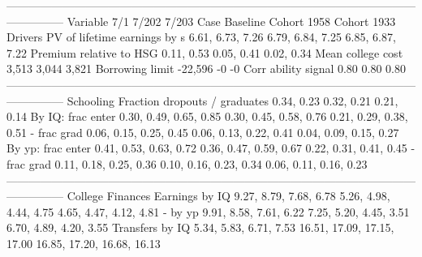 ---------------------------------------------------------------------------------------------------------------------------
                              Variable                          7/1                       7/202                       7/203
                                  Case                     Baseline                 Cohort 1958                 Cohort 1933
                               Drivers                                                                                     
          PV of lifetime earnings by s             6.61, 6.73, 7.26            6.79, 6.84, 7.25            6.85, 6.87, 7.22
               Premium relative to HSG                   0.11, 0.53                  0.05, 0.41                  0.02, 0.34
                     Mean college cost                        3,513                       3,044                       3,821
                       Borrowing limit                      -22,596                          -0                          -0
                   Corr ability signal                         0.80                        0.80                        0.80
---------------------------------------------------------------------------------------------------------------------------
                             Schooling                                                                                     
         Fraction dropouts / graduates                   0.34, 0.23                  0.32, 0.21                  0.21, 0.14
                     By IQ: frac enter       0.30, 0.49, 0.65, 0.85      0.30, 0.45, 0.58, 0.76      0.21, 0.29, 0.38, 0.51
                           - frac grad       0.06, 0.15, 0.25, 0.45      0.06, 0.13, 0.22, 0.41      0.04, 0.09, 0.15, 0.27
                     By yp: frac enter       0.41, 0.53, 0.63, 0.72      0.36, 0.47, 0.59, 0.67      0.22, 0.31, 0.41, 0.45
                           - frac grad       0.11, 0.18, 0.25, 0.36      0.10, 0.16, 0.23, 0.34      0.06, 0.11, 0.16, 0.23
---------------------------------------------------------------------------------------------------------------------------
                      College Finances                                                                                     
                        Earnings by IQ       9.27, 8.79, 7.68, 6.78      5.26, 4.98, 4.44, 4.75      4.65, 4.47, 4.12, 4.81
                               - by yp       9.91, 8.58, 7.61, 6.22      7.25, 5.20, 4.45, 3.51      6.70, 4.89, 4.20, 3.55
                       Transfers by IQ       5.34, 5.83, 6.71, 7.53  16.51, 17.09, 17.15, 17.00  16.85, 17.20, 16.68, 16.13
